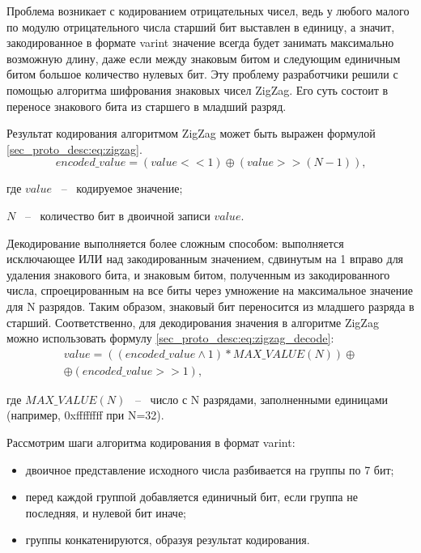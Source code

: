 Проблема возникает с кодированием отрицательных чисел, ведь у любого малого по модулю отрицательного числа старший бит выставлен в единицу, а значит,
закодированное в формате varint значение всегда будет занимать максимально возможную длину, даже если между знаковым битом и следующим единичным битом 
большое количество нулевых бит. Эту проблему разработчики решили с помощью алгоритма шифрования знаковых чисел ZigZag. Его суть состоит в переносе знакового бита
из старшего в младший разряд.

\pagebreak

Результат кодирования алгоритмом ZigZag может быть выражен формулой \eqref{sec_proto_desc:eq:zigzag}.
\begin{equation}
    \label{sec_proto_desc:eq:zigzag}
    encoded\_value = (value << 1) \oplus (value >> (N - 1)) \text{,}
\end{equation}
\begin{explanationx}
\item [где] $ value $ ~--~ кодируемое значение;
\item       $ N $ ~--~ количество бит в двоичной записи $ value $.
\end{explanationx}

Декодирование выполняется более сложным способом: выполняется исключающее ИЛИ над закодированным значением,
сдвинутым на 1 вправо для удаления знакового бита, и знаковым битом, полученным из закодированного числа,
спроецированным на все биты через умножение на максимальное значение для N разрядов.
Таким образом, знаковый бит переносится из младшего разряда в старший. Соответственно, для декодирования значения в алгоритме ZigZag можно использовать формулу \ref{sec_proto_desc:eq:zigzag_decode}:
\begin{gather}
    \label{sec_proto_desc:eq:zigzag_decode}
        value = ((encoded\_value \land 1) * MAX\_VALUE(N)) \oplus \nonumber\\
        \oplus (encoded\_value >> 1) \text{,}
\end{gather}
\begin{explanationx}
\item [где] $ MAX\_VALUE(N) $ ~--~ число с N разрядами, заполненными единицами (например, 0xffffffff при N=32).
\end{explanationx}

Рассмотрим шаги алгоритма кодирования в формат varint:

\begin{itemize}
    \item двоичное представление исходного числа разбивается на группы по 7 бит;
    \item перед каждой группой добавляется единичный бит, если группа не последняя, и нулевой бит иначе;
    \item группы конкатенируются, образуя результат кодирования.
\end{itemize}

